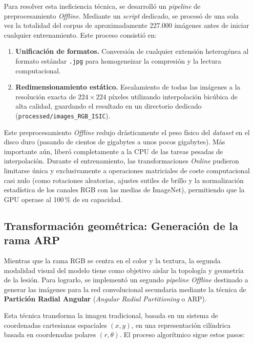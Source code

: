 Para resolver esta ineficiencia técnica, se desarrolló un \textit{pipeline} de preprocesamiento \textit{Offline}. Mediante un \textit{script} dedicado, se procesó de una sola vez la totalidad del corpus de aproximadamente 227.000 imágenes antes de iniciar cualquier entrenamiento. Este proceso consistió en:

\begin{enumerate}
	\item \textbf{Unificación de formatos.} Conversión de cualquier extensión heterogénea al formato estándar \texttt{.jpg} para homogeneizar la compresión y la lectura computacional.
	
	\item \textbf{Redimensionamiento estático.} Escalamiento de todas las imágenes a la resolución exacta de $224 \times 224$ píxeles utilizando interpolación bicúbica de alta calidad, guardando el resultado en un directorio dedicado (\texttt{processed/images\_RGB\_ISIC}).
\end{enumerate}

Este preprocesamiento \textit{Offline} redujo drásticamente el peso físico del \textit{dataset} en el disco duro (pasando de cientos de gigabytes a unos pocos gigabytes). Más importante aún, liberó completamente a la CPU de las tareas pesadas de interpolación. Durante el entrenamiento, las transformaciones \textit{Online} pudieron limitarse única y exclusivamente a operaciones matriciales de coste computacional casi nulo (como rotaciones aleatorias, ajustes sutiles de brillo y la normalización estadística de los canales RGB con las medias de ImageNet), permitiendo que la GPU operase al 100\,\% de su capacidad.

\subsection{Transformación geométrica: Generación de la rama ARP}

Mientras que la rama RGB se centra en el color y la textura, la segunda modalidad visual del modelo tiene como objetivo aislar la topología y geometría de la lesión. Para lograrlo, se implementó un segundo \textit{pipeline Offline} destinado a generar las imágenes para la red convolucional secundaria mediante la técnica de \textbf{Partición Radial Angular} (\textit{Angular Radial Partitioning} o ARP).

Esta técnica transforma la imagen tradicional, basada en un sistema de coordenadas cartesianas espaciales $(x, y)$, en una representación cilíndrica basada en coordenadas polares $(r, \theta)$. El proceso algorítmico sigue estos pasos:

